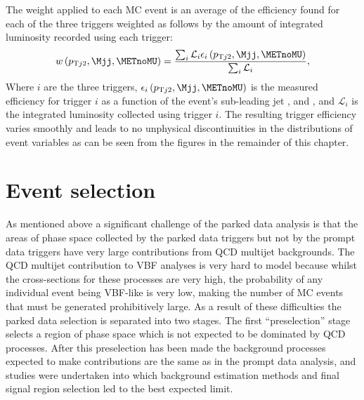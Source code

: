  The weight applied to each \ac{MC} event is an average of the efficiency found for each of the three triggers weighted as follows by the amount of integrated luminosity recorded using each trigger:
\begin{equation}
  \label{eq:parkedtrigweight}
  w\left(p_{\mathrm{T}j2},\Mjj,\METnoMU\right)=\frac{\sum_{i}\mathcal{L}_{i}\epsilon_{i}\left(p_{\mathrm{T}j2},\Mjj,\METnoMU\right)}{\sum_{i}\mathcal{L}_{i}},
\end{equation}
Where $i$ are the three triggers, $\epsilon_{i}\left(p_{\mathrm{T}j2},\Mjj,\METnoMU\right)$ is the measured efficiency for trigger $i$ as a function of the event's sub-leading jet \pt, \Mjj and \METnoMU, and $\mathcal{L}_{i}$ is the integrated luminosity collected using trigger $i$. The resulting trigger efficiency varies smoothly and leads to no unphysical discontinuities in the distributions of event variables as can be seen from the figures in the remainder of this chapter.

\section{Event selection}
\label{sec:parkedsel}
As mentioned above a significant challenge of the parked data analysis is that the areas of phase space collected by the parked data triggers but not by the prompt data triggers have very large contributions from \ac{QCD} multijet backgrounds. The \ac{QCD} multijet contribution to \ac{VBF} analyses is very hard to model because whilst the cross-sections for these processes are very high, the probability of any individual event being \ac{VBF}-like is very low, making the number of \ac{MC} events that must be generated prohibitively large. As a result of these difficulties the parked data selection is separated into two stages. The first ``preselection'' stage selects a region of phase space which is not expected to be dominated by \ac{QCD} processes. After this preselection has been made the background processes expected to make contributions are the same as in the prompt data analysis, and studies were undertaken into which background estimation methods and final signal region selection led to the best expected limit.


